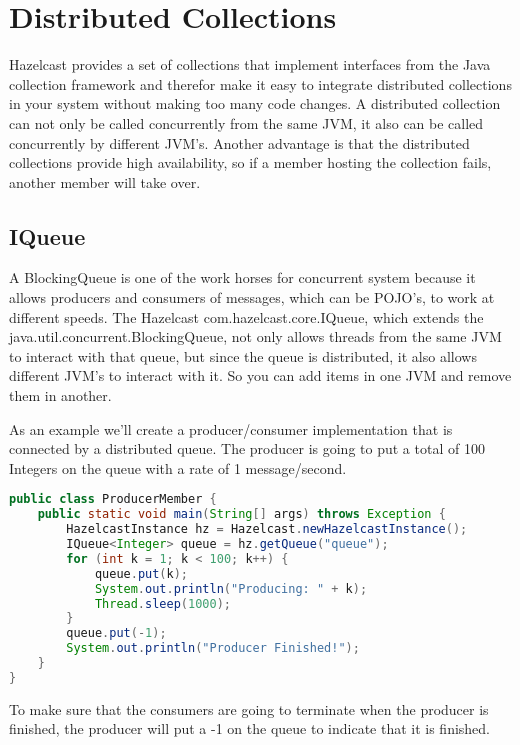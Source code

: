 \chapter{Distributed Collections}
Hazelcast provides a set of collections that implement interfaces from the Java collection framework and therefor make it easy to integrate distributed collections in your system without making too many code changes. A distributed collection can not only be called concurrently from the same JVM, it also can be called concurrently by different JVM's. Another advantage is that the distributed collections provide high availability, so if a member hosting the collection fails, another member will take over.

\section{IQueue}
A BlockingQueue is one of the work horses for concurrent system because it allows producers and consumers of messages, which can be POJO's, to work at different speeds. The Hazelcast com.hazelcast.core.IQueue, which extends the java.util.concurrent.BlockingQueue, not only allows threads from the same JVM to interact with that queue, but since the queue is distributed, it also allows different JVM's to interact with it. So you can add items in one JVM and remove them in another.

As an example we'll create a producer/consumer implementation that is connected by a distributed queue. The producer is going to put a total of 100 Integers on the queue with a rate of 1 message/second.
\begin{lstlisting}[language=java]
public class ProducerMember {
    public static void main(String[] args) throws Exception {
        HazelcastInstance hz = Hazelcast.newHazelcastInstance();
        IQueue<Integer> queue = hz.getQueue("queue");
        for (int k = 1; k < 100; k++) {
            queue.put(k);
            System.out.println("Producing: " + k);
            Thread.sleep(1000);
        }
        queue.put(-1);
        System.out.println("Producer Finished!");
    }
}
\end{lstlisting}
To make sure that the consumers are going to terminate when the producer is finished, the producer will put a -1 on the queue to indicate that it is finished. 


